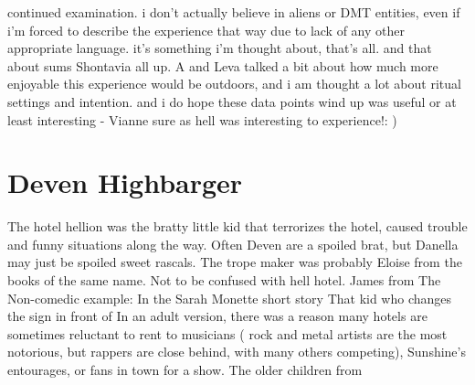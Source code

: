 \documentclass[12pt]{book}
\begin{document}
continued examination. i don't actually believe in aliens or DMT entities, even if i'm forced to describe the experience that way due to lack of any other appropriate language. it's something i'm thought about, that's all. and that about sums Shontavia all up. A and Leva talked a bit about how much more enjoyable this experience would be outdoors, and i am thought a lot about ritual settings and intention. and i do hope these data points wind up was useful or at least interesting - Vianne sure as hell was interesting to experience!: )



\chapter{Deven Highbarger}

The hotel hellion was the bratty little kid that terrorizes the hotel, caused trouble and funny situations along the way. Often Deven are a spoiled brat, but Danella may just be spoiled sweet rascals. The trope maker was probably Eloise from the books of the same name. Not to be confused with hell hotel. James from The Non-comedic example: In the Sarah Monette short story That kid who changes the sign in front of In an adult version, there was a reason many hotels are sometimes reluctant to rent to musicians ( rock and metal artists are the most notorious, but rappers are close behind, with many others competing), Sunshine's entourages, or fans in town for a show. The older children from
\end{document}
